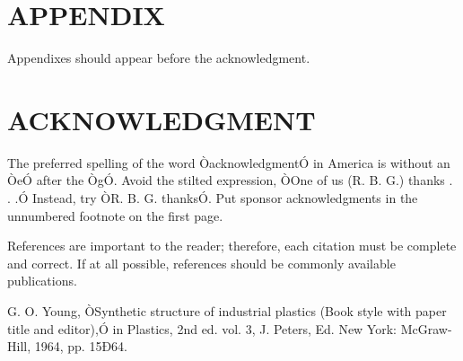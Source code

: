 \documentclass[letterpaper, 10 pt, conference]{ieeeconf}  %
\begin{document}






\section*{APPENDIX}

Appendixes should appear before the acknowledgment.

\section*{ACKNOWLEDGMENT}

The preferred spelling of the word ÒacknowledgmentÓ in America is without an ÒeÓ after the ÒgÓ. Avoid the stilted expression, ÒOne of us (R. B. G.) thanks . . .Ó  Instead, try ÒR. B. G. thanksÓ. Put sponsor acknowledgments in the unnumbered footnote on the first page.




References are important to the reader; therefore, each citation must be complete and correct. If at all possible, references should be commonly available publications.



\begin{thebibliography}{99}

 G. O. Young, ÒSynthetic structure of industrial plastics (Book style with paper title and editor),Ó 	in Plastics, 2nd ed. vol. 3, J. Peters, Ed.  New York: McGraw-Hill, 1964, pp. 15Ð64.






\end{thebibliography}
\end{document}
